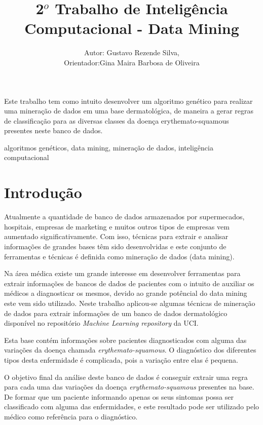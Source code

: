 \documentclass[11pt]{article}
\title{2$^o$ Trabalho de Inteligência Computacional - Data Mining}
\author{Autor: Gustavo Rezende Silva,\\ Orientador:Gina Maira Barbosa
de Oliveira}
\begin{document}
\maketitle


\begin{resumo}
Este trabalho tem como intuito desenvolver um algoritmo genético para realizar
uma mineração de dados em uma base dermatológica, de maneira a gerar regras de
classificação para as diversas classes da doença erythemato-squamous presentes
neste banco de dados.
\end{resumo}

\begin{palavraschave}
algoritmos genéticos, data mining, mineração de dados, inteligência computacional
\end{palavraschave}

\section{Introdução}
\label{sec:intro}

Atualmente a quantidade de banco de dados armazenados por supermecados, hospitais,
empresas de marketing e muitos outros tipos de empresas vem aumentado significativamente.
Com isso, técnicas para extrair e analisar informações de grandes bases têm sido
desenvolvidas e este conjunto de ferramentas e técnicas é definida como
mineração de dados (data mining).

Na área médica existe um grande interesse em desenvolver ferramentas para extrair
informações de bancos de dados de pacientes com o intuito de auxiliar os médicos
a diagnosticar os mesmos, devido ao grande potêncial do data mining este vem sido
 utilizado. Neste trabalho aplicou-se algumas técnicas de mineração
de dados para extrair informações de um banco de dados dermatológico disponível
no repositório \textit{Machine Learning repository} da UCI.

Esta base contém informações sobre pacientes diagnosticados com alguma das
variações da doença chamada \textit{erythemato-squamous}. O diagnóstico dos
diferentes tipos desta enfermidade é complicada, pois a variação entre elas
é pequena.

O objetivo final da análise deste banco de dados é conseguir extrair uma regra
para cada uma das variações da doença \textit{erythemato-squamous} presentes na
base. De formar que um paciente informando apenas os seus sintomas possa ser classificado
com alguma das enfermidades, e este resultado pode ser utilizado pelo médico
como referência para o diagnóstico.
\end{document}
